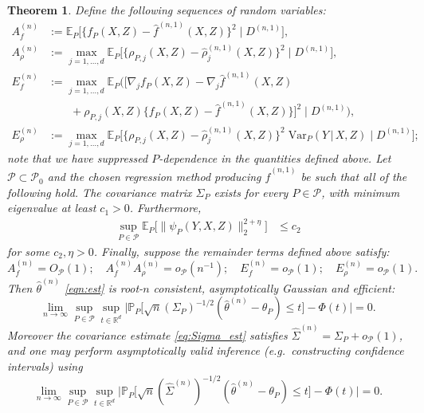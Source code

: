 \documentclass[aos]{imsart}
\renewcommand{\Pr}{\mathbb{P}}
\newcommand{\R}{\mathbb{R}}
\newcommand{\E}{\mathbb{E}}
\newcommand{\Var}{\mathrm{Var}}
\newcommand{\given}{\,|\,}
\newtheorem{theorem}{Theorem}
\begin{document}
	\begin{theorem}
		\label{thm:clt}
		Define the following sequences of random variables:
		\begin{align*}
			A_f^{(n)} &:= \E_P \big[\{f_P(X,Z)-\hat f^{(n,1)}(X,Z)\}^2 \; \big| \; D^{(n,1)}\big],\\
			A_\rho^{(n)} &:= \max_{j=1,\ldots,d} \E_P\big[\{\rho_{P,j}(X,Z)-\hat \rho^{(n,1)}_j(X,Z)\}^2 \; \big| \; D^{(n,1)}\big],\\
			E_f^{(n)} &:= \max_{j=1,\ldots,d} \E_P\Big(\big[ \nabla_j f_P(X,Z)-\nabla_j \hat f^{(n,1)}(X,Z)  \\
			& \qquad +\rho_{P,j}(X,Z)\{f_P(X,Z)-\hat f^{(n,1)}(X,Z)\}\big]^2 \; \Big| \; D^{(n,1)}\Big),\\
			E_\rho^{(n)} &:= \max_{j=1,\ldots,d}\E_P\big[\{\rho_{P,j}(X,Z)-\hat \rho^{(n,1)}_j(X,Z)\}^2 \; \Var_P(Y \given  X,Z) \; \big| \; D^{(n,1)}\big];
		\end{align*}
	note that we have suppressed $P$-dependence in the quantities defined above.
		Let $\mathcal{P} \subset \mathcal{P}_0$ and the chosen regression method producing $\hat{f}^{(n,1)}$ be such that all of the following hold. The covariance matrix $\Sigma_P$ exists for every $P\in\mathcal{P}$, with minimum eigenvalue at least $c_1>0$. Furthermore, 
		\begin{align*}
			\sup_{P\in\mathcal{P}} \E_P\big[\|\psi_{P}(Y,X,Z)\|_2^{2+\eta}\big]&\leq c_2
		\end{align*}
		for some $c_2,\eta>0$. Finally, suppose the remainder terms defined above satisfy:
		\begin{equation}
			\label{eqn:cltrates}
			A_f^{(n)} = O_\mathcal{P}(1);\quad A_f^{(n)}A_\rho^{(n)} = o_{\mathcal{P}}(n^{-1});\quad
			E_f^{(n)}=o_{\mathcal{P}}(1);\quad
			E_\rho^{(n)}=o_{\mathcal{P}}(1).
		\end{equation}
		Then $\hat{\theta}^{(n)}$ \eqref{eqn:est} is root-$n$ consistent, asymptotically Gaussian and efficient:
		\begin{equation*}
			\lim_{n\to\infty}\sup_{P\in\mathcal{P}} \sup_{t\in\R^d} \Big| \Pr_P\big[\sqrt{n}(\Sigma_P)^{-1/2} (\hat\theta^{(n)}-\theta_P)\leq t\big]-\Phi(t)\Big| = 0.
		\end{equation*}
		Moreover the covariance estimate \eqref{eq:Sigma_est} satisfies $\hat\Sigma^{(n)} = \Sigma_P + o_{\mathcal{P}}(1)$, and one may perform asymptotically valid inference (e.g.\ constructing confidence intervals) using
		\begin{equation*}
			\lim_{n\to\infty}\sup_{P\in\mathcal{P}} \sup_{t\in\R^d} \Big| \Pr_P\big[\sqrt{n}(\hat\Sigma^{(n)})^{-1/2} (\hat\theta^{(n)}-\theta_P)\leq t\big]-\Phi(t)\Big| = 0.
		\end{equation*}
	\end{theorem}
\end{document}
